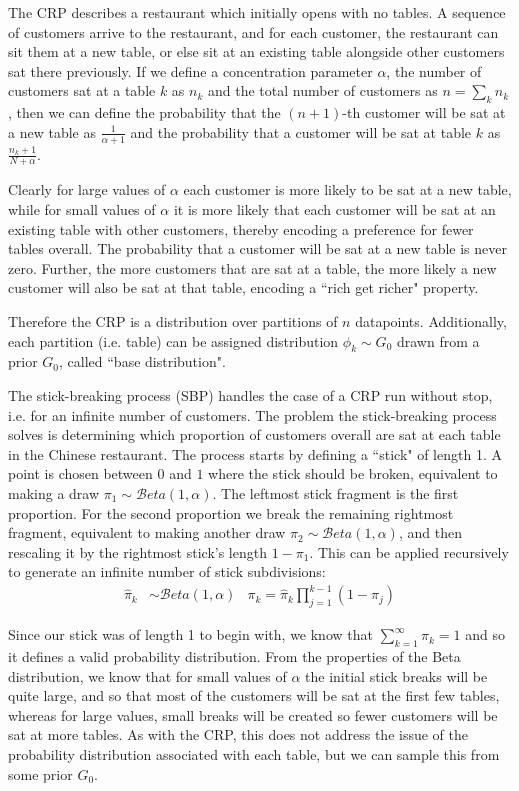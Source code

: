 The CRP\cite{Neal2000} describes a restaurant which initially opens with no tables. A sequence of customers arrive to the restaurant, and for each customer, the restaurant can sit them at a new table, or else sit at an existing table alongside other customers sat there previously. If we define a concentration parameter $\alpha$, the number of customers sat at a table $k$ as $n_k$ and the total number of customers as $n = \sum_k n_k$, then we can define the probability that the $(n+1)$-th customer will be sat at a new table as $\frac{1}{\alpha + 1}$ and the probability that a customer will be sat at table $k$ as $\frac{n_k + 1}{N + \alpha}$. 

Clearly for large values of $\alpha$ each customer is more likely to be sat at a new table, while for small values of $\alpha$ it is more likely that each customer will be sat at an existing table with other customers, thereby encoding a preference for fewer tables overall. The probability that a customer will be sat at a new table is never zero. Further, the more customers that are sat at a table, the more likely a new customer will also be sat at that table, encoding a ``rich get richer" property.

Therefore the CRP is a distribution over partitions of $n$ datapoints. Additionally, each  partition (i.e. table) can be assigned distribution $\phi_k \sim G_0$ drawn from a prior $G_0$, called ``base distribution".

The stick-breaking process (SBP) handles the case of a CRP run without stop, i.e. for an infinite number of customers. The problem the stick-breaking process solves is determining which proportion of customers overall are sat at each table in the Chinese restaurant. The process starts by defining a ``stick" of length 1. A point is chosen between $0$ and $1$ where the stick should be broken, equivalent to making a draw $\pi_1 \sim \mathcal{B}eta\left(1, \alpha\right)$. The leftmost stick fragment is the first proportion. For the second proportion we break the remaining rightmost fragment, equivalent to making another draw $\pi_2 \sim \mathcal{B}eta\left(1, \alpha\right)$, and then rescaling it by the rightmost stick's length $1-\pi_1$. This can be applied recursively to generate an infinite number of stick subdivisions:
\begin{align}
\hat{\pi}_k & \sim \mathcal{B}eta\left(1, \alpha\right) & \pi_k = \hat{\pi}_k \prod_{j=1}^{k-1} (1 - \pi_j)
\end{align}

Since our stick was of length 1 to begin with, we know that $\sum_{k=1}^{\infty} \pi_k = 1$ and so it defines a valid probability distribution. From the properties of the Beta distribution, we know that for small values of $\alpha$ the initial stick breaks will be quite large, and so that most of the customers will be sat at the first few tables, whereas for large values, small breaks will be created so fewer customers will be sat at more tables. As with the CRP, this does not address the issue of the probability distribution associated with each table, but we can sample this from some prior $G_0$.

